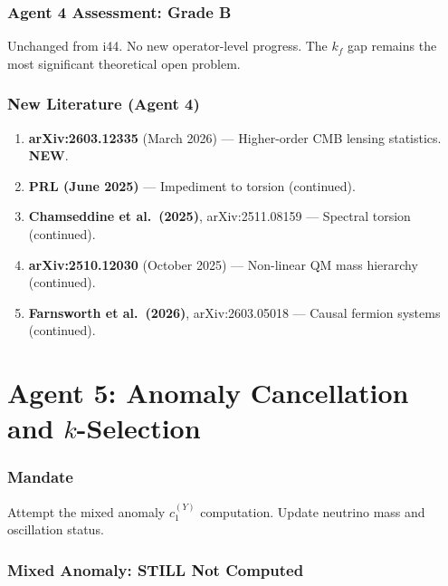 \documentclass[11pt,a4paper]{article}
\newcommand{\NEW}{\textcolor{dfdblue}{\textbf{NEW}}}
\begin{document}
\section{Agent 4 Assessment: Grade B}

Unchanged from i44. No new operator-level progress. The $k_f$ gap remains the most significant theoretical open problem.

\section{New Literature (Agent 4)}

\begin{enumerate}
\item \textbf{arXiv:2603.12335} (March 2026) --- Higher-order CMB lensing statistics. \NEW.
\item \textbf{PRL (June 2025)} --- Impediment to torsion (continued).
\item \textbf{Chamseddine et al.\ (2025)}, arXiv:2511.08159 --- Spectral torsion (continued).
\item \textbf{arXiv:2510.12030} (October 2025) --- Non-linear QM mass hierarchy (continued).
\item \textbf{Farnsworth et al.\ (2026)}, arXiv:2603.05018 --- Causal fermion systems (continued).
\end{enumerate}


\part{Agent 5: Anomaly Cancellation and $k$-Selection}
\label{part:agent5}

\section{Mandate}

Attempt the mixed anomaly $c_1^{(Y)}$ computation. Update neutrino mass and oscillation status.

\section{Mixed Anomaly: STILL Not Computed}
\end{document}
